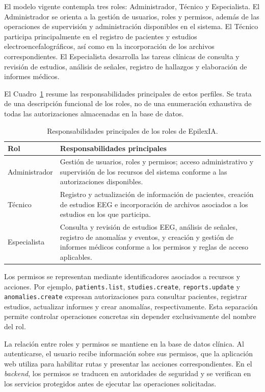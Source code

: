 El modelo vigente contempla tres roles: Administrador, Técnico y Especialista. El Administrador se orienta a la gestión de usuarios, roles y permisos, además de las operaciones de supervisión y administración disponibles en el sistema. El Técnico participa principalmente en el registro de pacientes y estudios electroencefalográficos, así como en la incorporación de los archivos correspondientes. El Especialista desarrolla las tareas clínicas de consulta y revisión de estudios, análisis de señales, registro de hallazgos y elaboración de informes médicos.

El Cuadro~\ref{tab:roles-permisos-epilexia} resume las responsabilidades principales de estos perfiles. Se trata de una descripción funcional de los roles, no de una enumeración exhaustiva de todas las autorizaciones almacenadas en la base de datos.

\begin{table}[H]
\centering
\caption{Responsabilidades principales de los roles de EpilexIA.}
\label{tab:roles-permisos-epilexia}
\small
\begin{tabular}{|p{}|p{}|}
\hline
\textbf{Rol} & \textbf{Responsabilidades principales} \\ \hline
Administrador & Gestión de usuarios, roles y permisos; acceso administrativo y supervisión de los recursos del sistema conforme a las autorizaciones disponibles. \\ \hline
Técnico & Registro y actualización de información de pacientes, creación de estudios EEG e incorporación de archivos asociados a los estudios en los que participa. \\ \hline
Especialista & Consulta y revisión de estudios EEG, análisis de señales, registro de anomalías y eventos, y creación y gestión de informes médicos conforme a los permisos y reglas de acceso aplicables. \\ \hline
\end{tabular}
\end{table}

Los permisos se representan mediante identificadores asociados a recursos y acciones. Por ejemplo, \texttt{patients.list}, \texttt{studies.create}, \texttt{reports.update} y \texttt{anomalies.create} expresan autorizaciones para consultar pacientes, registrar estudios, actualizar informes y crear anomalías, respectivamente. Esta separación permite controlar operaciones concretas sin depender exclusivamente del nombre del rol.

La relación entre roles y permisos se mantiene en la base de datos clínica. Al autenticarse, el usuario recibe información sobre sus permisos, que la aplicación web utiliza para habilitar rutas y presentar las acciones correspondientes. En el \textit{backend}, los permisos se traducen en autoridades de seguridad y se verifican en los servicios protegidos antes de ejecutar las operaciones solicitadas.

